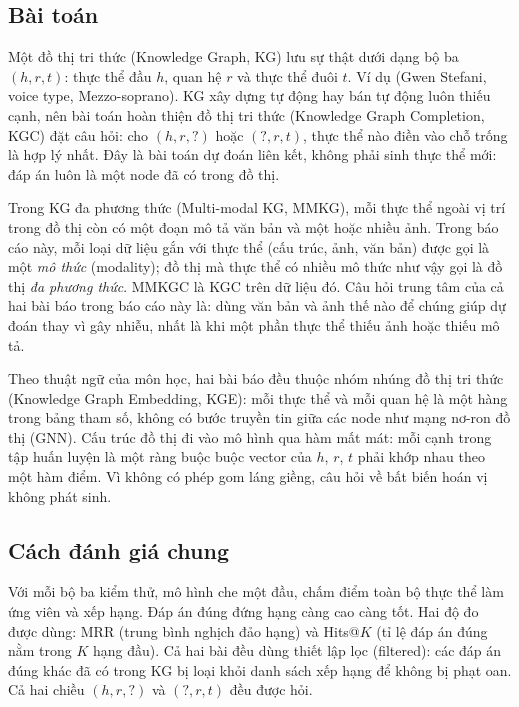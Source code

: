 \documentclass[conference,a4paper]{IEEEtran}
\begin{document}
\subsection{Bài toán}

Một đồ thị tri thức (Knowledge Graph, KG) lưu sự thật dưới dạng bộ ba $(h, r, t)$: thực thể đầu $h$, quan hệ $r$ và thực thể đuôi $t$. Ví dụ (Gwen Stefani, voice type, Mezzo-soprano). KG xây dựng tự động hay bán tự động luôn thiếu cạnh, nên bài toán hoàn thiện đồ thị tri thức (Knowledge Graph Completion, KGC) đặt câu hỏi: cho $(h, r, ?)$ hoặc $(?, r, t)$, thực thể nào điền vào chỗ trống là hợp lý nhất. Đây là bài toán dự đoán liên kết, không phải sinh thực thể mới: đáp án luôn là một node đã có trong đồ thị.

Trong KG đa phương thức (Multi-modal KG, MMKG), mỗi thực thể ngoài vị trí trong đồ thị còn có một đoạn mô tả văn bản và một hoặc nhiều ảnh. Trong báo cáo này, mỗi loại dữ liệu gắn với thực thể (cấu trúc, ảnh, văn bản) được gọi là một \emph{mô thức} (modality); đồ thị mà thực thể có nhiều mô thức như vậy gọi là đồ thị \emph{đa phương thức}. MMKGC là KGC trên dữ liệu đó. Câu hỏi trung tâm của cả hai bài báo trong báo cáo này là: dùng văn bản và ảnh thế nào để chúng giúp dự đoán thay vì gây nhiễu, nhất là khi một phần thực thể thiếu ảnh hoặc thiếu mô tả.

Theo thuật ngữ của môn học, hai bài báo đều thuộc nhóm nhúng đồ thị tri thức (Knowledge Graph Embedding, KGE): mỗi thực thể và mỗi quan hệ là một hàng trong bảng tham số, không có bước truyền tin giữa các node như mạng nơ-ron đồ thị (GNN). Cấu trúc đồ thị đi vào mô hình qua hàm mất mát: mỗi cạnh trong tập huấn luyện là một ràng buộc buộc vector của $h$, $r$, $t$ phải khớp nhau theo một hàm điểm. Vì không có phép gom láng giềng, câu hỏi về bất biến hoán vị không phát sinh.

\subsection{Cách đánh giá chung}

Với mỗi bộ ba kiểm thử, mô hình che một đầu, chấm điểm toàn bộ thực thể làm ứng viên và xếp hạng. Đáp án đúng đứng hạng càng cao càng tốt. Hai độ đo được dùng: MRR (trung bình nghịch đảo hạng) và Hits@$K$ (tỉ lệ đáp án đúng nằm trong $K$ hạng đầu). Cả hai bài đều dùng thiết lập lọc (filtered): các đáp án đúng khác đã có trong KG bị loại khỏi danh sách xếp hạng để không bị phạt oan. Cả hai chiều $(h,r,?)$ và $(?,r,t)$ đều được hỏi.
\end{document}
